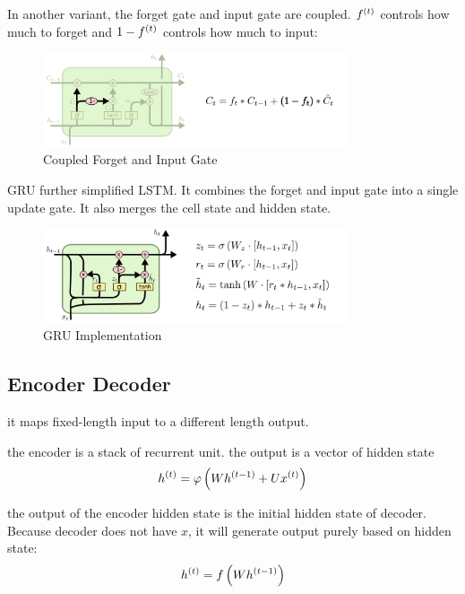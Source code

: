 \begin{definition}
    In another variant, the forget gate and input gate are coupled. ${f}^{(t)}$ controls how much to forget and $1- {f}^{(t)}$ controls how much to input:
    \begin{figure}[H]
\includegraphics[width=0.8\textwidth]{machine_learning/pic/04/LSTM3-var-tied.png}
\centering
\caption{Coupled Forget and Input Gate}
\end{figure}
\end{definition}


\begin{definition}[GRU]
    GRU further simplified LSTM. It combines the forget and input gate into a single update gate. It also merges the cell state and hidden state.
\begin{figure}[H]
\includegraphics[width=0.8\textwidth]{machine_learning/pic/04/LSTM3-var-GRU.png}
\centering
\caption{GRU Implementation}
\end{figure}
\end{definition}



\subsection{Encoder Decoder}

it maps fixed-length input to a different length output.

the encoder is a stack of recurrent unit. the output is a vector of hidden state
\begin{equation}
    {h}^{(t)} = \varphi \left(W {h}^{(t-1)} + U {x}^{(t)} \right)
\end{equation}

the output of the encoder hidden state is the initial hidden state of decoder. Because decoder does not have $x$, it will generate output purely based on hidden state:
\begin{equation}
    {h}^{(t)} = f \left(W {h}^{(t-1)} \right)
\end{equation}

